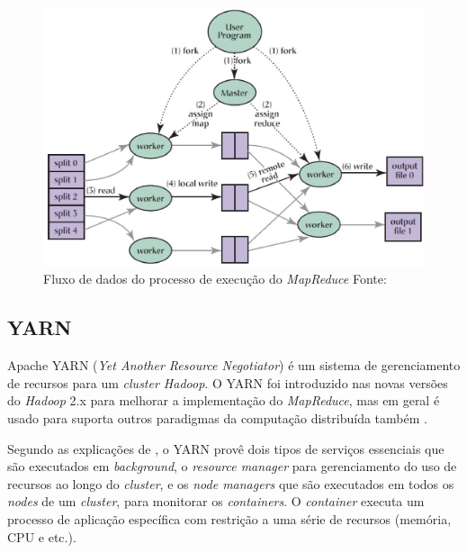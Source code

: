                 \begin{figure}[ht!]
                    \centering
                    \includegraphics[keepaspectratio=true,scale=0.5]
                        {figuras/figura6.eps}
                    \caption[Fluxo de dados do processo de execução do \textit{MapReduce}]
                    {Fluxo de dados do processo de execução do \textit{MapReduce}
                    \protect \linebreak Fonte: }
                    \label{figura6}
                \end{figure}

        \subsection{YARN}

            Apache YARN (\textit{Yet Another Resource Negotiator}) é um sistema de gerenciamento de recursos para
            um \textit{cluster Hadoop}. O YARN foi introduzido nas novas versões do \textit{Hadoop} 2.x para melhorar
            a implementação do \textit{MapReduce}, mas em geral é usado para suporta outros paradigmas da
            computação distribuída também \cite{yarnapache}.

            Segundo as explicações de , o YARN provê dois tipos de serviços essenciais que são
            executados em \textit{background}, o \textit{resource manager} para gerenciamento do uso de recursos ao
            longo do \textit{cluster}, e os \textit{node managers} que são executados em todos os \textit{nodes} de um
            \textit{cluster}, para monitorar os \textit{containers}. O \textit{container} executa um processo de aplicação
            específica com restrição a uma série de recursos (memória, CPU e etc.).

